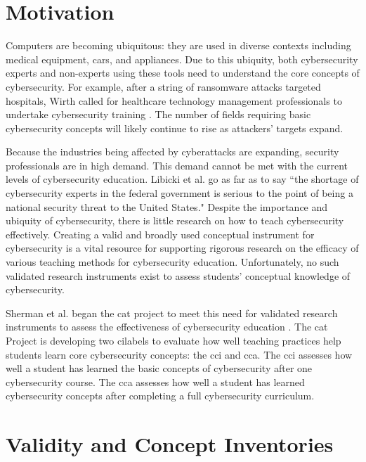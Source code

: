 \section{Motivation}

Computers are becoming ubiquitous: they are used in diverse contexts including medical equipment, cars, and appliances. Due to this ubiquity, both cybersecurity experts and non-experts using these tools need to understand the core concepts of cybersecurity. For example, after a string of ransomware attacks targeted hospitals, Wirth called for healthcare technology management professionals to undertake cybersecurity training \cite{htm, ransomware}. The number of fields requiring basic cybersecurity concepts will likely continue to rise as attackers' targets expand.

Because the industries being affected by cyberattacks are expanding, security professionals are in high demand. This demand cannot be met with the current levels of cybersecurity education. Libicki et al. \cite{hackers_wanted} go as far as to say ``the shortage of cybersecurity experts in the federal government is serious to the point of being a national security threat to the United States." Despite the importance and ubiquity of cybersecurity, there is little research on how to teach cybersecurity effectively. Creating a valid and broadly used conceptual instrument for cybersecurity is a vital resource for supporting rigorous research on the efficacy of various teaching methods for cybersecurity education. Unfortunately, no such validated research instruments exist to assess students' conceptual knowledge of cybersecurity. 

Sherman et al. began the \gls{cat} project to meet this need for validated research instruments to assess the effectiveness of cybersecurity education \cite{delphi, misconceptions, scenarios, jcerp, status, hackathon}. The \gls{cat} Project is developing two \glspl{cilabel} to evaluate how well teaching practices help students learn core cybersecurity concepts: the \gls{cci} and \gls{cca}. The \gls{cci} assesses how well a student has learned the basic concepts of cybersecurity after one cybersecurity course. The \gls{cca} assesses how well a student has learned cybersecurity concepts after completing a full cybersecurity curriculum.

\section{Validity and Concept Inventories}

